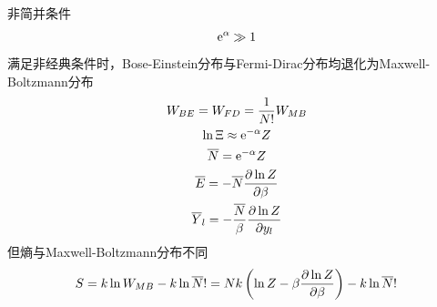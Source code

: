 非简并条件
\begin{gather*}
    \mathrm{e}^{\alpha} \gg 1
\end{gather*}
满足非经典条件时，Bose-Einstein分布与Fermi-Dirac分布均退化为Maxwell-Boltzmann分布
\begin{gather*}
    W_{BE} = W_{FD} = \frac{1}{N!} W_{MB}
    \\
    \ln \Xi \approx \mathrm{e}^{-\alpha} Z
    \\
    \overline{N} = \mathrm{e}^{-\alpha} Z
    \\
    \overline{E} = -\overline{N} \frac{\partial \ln Z}{\partial \beta}
    \\
    \overline{Y}_l = -\frac{\overline{N}}{\beta} \frac{\partial \ln Z}{\partial y_l}
\end{gather*}
但熵与Maxwell-Boltzmann分布不同
\begin{gather*}
    S = k \ln W_{MB} - k \ln \overline{N}! = Nk \left( \ln Z - \beta \frac{\partial \ln Z}{\partial \beta} \right) - k \ln \overline{N}!
\end{gather*}


